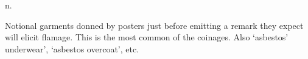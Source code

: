  n.

Notional garments donned by  posters just before emitting a remark they expect will elicit flamage. This is the most
common of the  coinages. Also `asbestos' underwear', `asbestos overcoat', etc.

